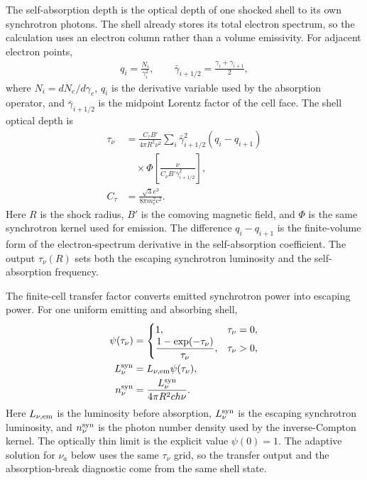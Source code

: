 \documentclass[twocolumn]{aastex702}
\begin{document}
The self-absorption depth is the optical depth of one shocked shell to its own
synchrotron photons.  The shell already stores its total electron spectrum, so
the calculation uses an electron column rather than a volume emissivity.  For
adjacent electron points,
\begin{equation}
\begin{aligned}
q_i=\frac{N_i}{\gamma_i^2},\qquad
\bar\gamma_{i+1/2}=\frac{\gamma_i+\gamma_{i+1}}{2},
\end{aligned}
\end{equation}
where \(N_i=dN_e/d\gamma_e\), \(q_i\) is the derivative variable used by the
absorption operator, and \(\bar\gamma_{i+1/2}\) is the midpoint Lorentz factor of
the cell face.  The shell optical depth is
\begin{equation}
\begin{aligned}
\tau_\nu&=
\frac{C_\tau B'}{4\pi R^2\nu^2}
\sum_i
\bar\gamma_{i+1/2}^2
\left(q_i-q_{i+1}\right)\\
&\quad\times
\Phi\!\left[
\frac{\nu}{C_\nu B'\bar\gamma_{i+1/2}^2}
\right],\\
C_\tau&=\frac{\sqrt{3}e^3}{8\pi m_e^2 c^2}.
\end{aligned}
\end{equation}
Here \(R\) is the shock radius, \(B'\) is the comoving magnetic field, and
\(\Phi\) is the same synchrotron kernel used for emission.  The difference
\(q_i-q_{i+1}\) is the finite-volume form of the electron-spectrum derivative in
the self-absorption coefficient.  The output \(\tau_\nu(R)\) sets both the
escaping synchrotron luminosity and the self-absorption frequency.

The finite-cell transfer factor converts emitted synchrotron power into escaping
power.  For one uniform emitting and absorbing shell,
\begin{equation}
\begin{aligned}
\psi(\tau_\nu)&=
\begin{cases}
1,&\tau_\nu=0,\\
\dfrac{1-\exp(-\tau_\nu)}{\tau_\nu},&\tau_\nu>0,
\end{cases}
\label{eq:finite-cell-transfer}\\
L_\nu^{\rm syn}&=L_{\nu,{\rm em}}\psi(\tau_\nu),\\
n_\nu^{\rm syn}&=\frac{L_\nu^{\rm syn}}{4\pi R^2 c h\nu}.
\end{aligned}
\end{equation}
Here \(L_{\nu,{\rm em}}\) is the luminosity before absorption, \(L_\nu^{\rm syn}\)
is the escaping synchrotron luminosity, and \(n_\nu^{\rm syn}\) is the photon
number density used by the inverse-Compton kernel.  The optically thin limit is
the explicit value \(\psi(0)=1\).  The adaptive solution for \(\nu_a\) below uses
the same \(\tau_\nu\) grid, so the transfer output and the absorption-break
diagnostic come from the same shell state.
\end{document}
